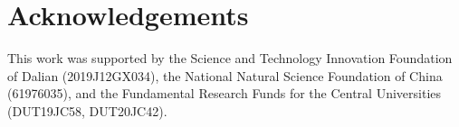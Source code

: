 \documentclass[runningheads]{llncs}
\begin{document}
\section*{Acknowledgements}
This work was supported by the Science and Technology Innovation Foundation of Dalian (2019J12GX034), the National Natural Science Foundation of China (61976035), and the Fundamental  Research Funds for the Central Universities (DUT19JC58, DUT20JC42).




\end{document}
